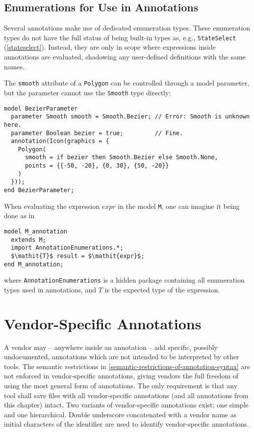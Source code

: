 \subsection{Enumerations for Use in Annotations}\label{enumerations-for-use-in-annotations}

Several annotations make use of dedicated enumeration types.
These enumeration types do not have the full status of being built-in types as, e.g., \lstinline!StateSelect! (\cref{stateselect}).
Instead, they are only in scope where expressions inside annotations are evaluated, shadowing any user-defined definitions with the same names.

\begin{example}
The \lstinline!smooth! attribute of a \lstinline!Polygon! can be controlled through a model parameter, but the parameter cannot use the \lstinline!Smooth! type directly:
\begin{lstlisting}[language=modelica]
model BezierParameter
  parameter Smooth smooth = Smooth.Bezier; // Error: Smooth is unknown here.
  parameter Boolean bezier = true;         // Fine.
  annotation(Icon(graphics = {
    Polygon(
      smooth = if bezier then Smooth.Bezier else Smooth.None,
      points = {{-50, -20}, {0, 30}, {50, -20}}
    )
  }));
end BezierParameter;
\end{lstlisting}
\end{example}

\begin{nonnormative}
When evaluating the expression $\mathit{expr}$ in the model \lstinline!M!, one can imagine it being done as in
\begin{lstlisting}[language=modelica]
model M_annotation
  extends M;
  import AnnotationEnumerations.*;
  $\mathit{T}$ result = $\mathit{expr}$;
end M_annotation;
\end{lstlisting}
where \lstinline!AnnotationEnumerations! is a hidden package containing all enumeration types used in annotations, and $\mathit{T}$ is the expected type of the expression.
\end{nonnormative}


\section{Vendor-Specific Annotations}\label{vendor-specific-annotations}

A vendor may -- anywhere inside an annotation -- add specific, possibly undocumented, annotations which are not intended to be interpreted by other tools.
The semantic restrictions in \cref{semantic-restrictions-of-annotation-syntax} are not enforced in vendor-specific annotations, giving vendors the full freedom of using the most general form of annotations.
The only requirement is that any tool shall save files with all vendor-specific annotations (and all annotations from this chapter) intact.
Two variants of vendor-specific annotations exist; one simple and one hierarchical.
Double underscore concatenated with a vendor name as initial characters of the identifier are used to identify vendor-specific annotations.

